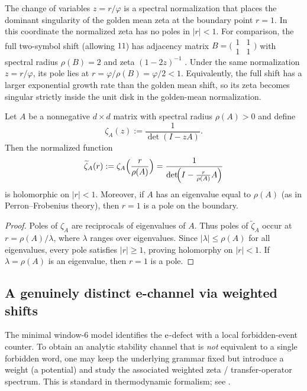 \begin{remark}
The change of variables $z=r/\varphi$ is a spectral normalization that places the dominant singularity of the golden mean zeta at the boundary point $r=1$.
In this coordinate the normalized zeta has no poles in $|r|<1$.
For comparison, the full two-symbol shift (allowing $11$) has adjacency matrix $B=\bigl(\begin{smallmatrix}1&1\\1&1\end{smallmatrix}\bigr)$ with spectral radius $\rho(B)=2$ and zeta $(1-2z)^{-1}$ \cite{LindMarcus1995}.
Under the same normalization $z=r/\varphi$, its pole lies at $r=\varphi/\rho(B)=\varphi/2<1$.
Equivalently, the full shift has a larger exponential growth rate than the golden mean shift, so its zeta becomes singular strictly inside the unit disk in the golden-mean normalization.
\end{remark}

\begin{proposition}
\label{prop:spectral_normalization_unit_disk}
Let $A$ be a nonnegative $d\times d$ matrix with spectral radius $\rho(A)>0$ and define
\[
\zeta_A(z):=\frac{1}{\det(I-zA)}.
\]
Then the normalized function
\[
\widetilde{\zeta}_A(r):=\zeta_A\Big(\frac{r}{\rho(A)}\Big)=\frac{1}{\det\!\Bigl(I-\frac{r}{\rho(A)}A\Bigr)}
\]
is holomorphic on $|r|<1$.
Moreover, if $A$ has an eigenvalue equal to $\rho(A)$ (as in Perron--Frobenius theory), then $r=1$ is a pole on the boundary.
\end{proposition}

\begin{proof}
Poles of $\zeta_A$ are reciprocals of eigenvalues of $A$.
Thus poles of $\widetilde{\zeta}_A$ occur at $r=\rho(A)/\lambda$, where $\lambda$ ranges over eigenvalues.
Since $|\lambda|\le \rho(A)$ for all eigenvalues, every pole satisfies $|r|\ge 1$, proving holomorphy on $|r|<1$.
If $\lambda=\rho(A)$ is an eigenvalue, then $r=1$ is a pole.
\end{proof}

\subsection{A genuinely distinct e-channel via weighted shifts}
The minimal window-$6$ model identifies the $\mathrm{e}$-defect with a local forbidden-event counter.
To obtain an analytic stability channel that is \emph{not} equivalent to a single forbidden word, one may keep the underlying grammar fixed but introduce a weight (a potential) and study the associated weighted zeta / transfer-operator spectrum.
This is standard in thermodynamic formalism; see \cite{Ruelle1978,Bowen1975,ParryPollicott1990}.

